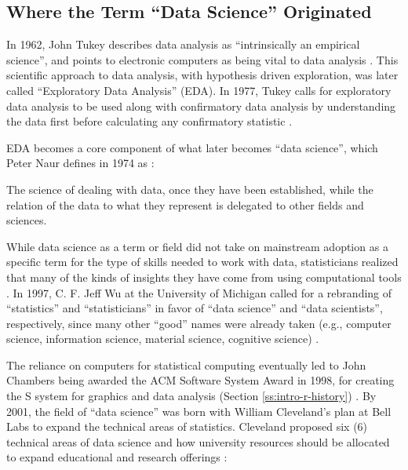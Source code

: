 \documentclass[010-intro.tex]{subfiles}
\begin{document}
\subsection{Where the Term ``Data Science'' Originated}

    In 1962, John Tukey describes data analysis as ``intrinsically an empirical science'',
    and points to electronic computers as being vital to data analysis
    \cite{tukeyFutureDataAnalysis1962, pressVeryShortHistory2013}.
    This scientific approach to data analysis,
    with hypothesis driven exploration,
    was later called ``Exploratory Data Analysis'' (EDA).
    In 1977,
    Tukey calls for exploratory data analysis to be used along with confirmatory data analysis
    by understanding the data first before calculating any confirmatory statistic
    \cite{tukeyExploratoryDataAnalysis1977}.
    
    EDA becomes a core component of what later becomes ``data science'',
    which Peter Naur defines in 1974 as \cite{pressVeryShortHistory2013}:
    \begin{displayquote}
        The science of dealing with data,
        once they have been established,
        while the relation of the data to what they represent
        is delegated to other fields and sciences.
    \end{displayquote}
    While data science as a term or field did not take on mainstream adoption as
    a specific term for the type of skills needed to work with data,
    statisticians realized that many of the kinds of insights they have
    come from using computational tools
    \cite{tukey1965technical, bradstreet1996teaching}.
    In 1997, C. F. Jeff Wu at the University of Michigan called for a rebranding of
    ``statistics'' and ``statisticians'' in favor of
    ``data science'' and ``data scientists'', respectively,
    since many other ``good'' names were already taken
    (e.g., computer science, information science, material science, cognitive science)
    \cite{pressVeryShortHistory2013}.

    The reliance on computers for statistical computing eventually led to
    John Chambers being awarded the ACM Software System Award in 1998,
    for creating the S system for graphics and data analysis
    (Section \ref{ss:intro-r-history})
    \cite{associationforcomputingmachineryACMSoftwareSystem1998}.
    By 2001, the field of ``data science'' was born with
    William Cleveland's plan at Bell Labs to expand the technical areas of statistics.
    Cleveland proposed six (6) technical areas of data science
    and how university resources should be allocated
    to expand educational and research offerings
    \cite{clevelandDataScienceAction2001}:
\end{document}
